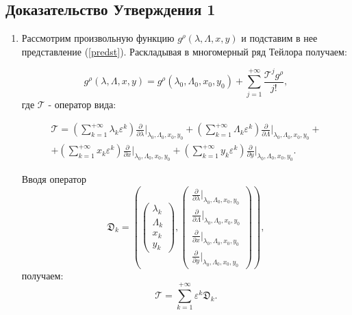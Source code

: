 \subsection{Доказательство Утверждения 1}

\begin{enumerate}

\item Рассмотрим произвольную функцию $g^\rho(\lambda,\Lambda,x,y)$ и подставим в нее представление (\ref{predst}). Раскладывая в многомерный ряд Тейлора получаем:

$$g^\rho(\lambda,\Lambda,x,y) = g^\rho(\lambda_0,\Lambda_0,x_0,y_0) + \sum_{j=1}^{+\infty} \frac{\mathcal{T}^j g^\rho}{j!},$$
где $\mathcal{T}$ - оператор вида:

\begin{multline*}
\mathcal{T} = 
\left(\sum_{k=1}^{+\infty} \lambda_k \varepsilon^k \right) \frac{\partial}{\partial \lambda} \bigg|_{\lambda_0,\Lambda_0,x_0,y_0}+
\left(\sum_{k=1}^{+\infty} \Lambda_k \varepsilon^k \right) \frac{\partial}{\partial \Lambda} \bigg|_{\lambda_0,\Lambda_0,x_0,y_0}+\\
+\left(\sum_{k=1}^{+\infty} x_k \varepsilon^k \right) \frac{\partial}{\partial x} \bigg|_{\lambda_0,\Lambda_0,x_0,y_0}
+\left(\sum_{k=1}^{+\infty} y_k \varepsilon^k \right) \frac{\partial}{\partial y} \bigg|_{\lambda_0,\Lambda_0,x_0,y_0}.
\end{multline*}

Вводя оператор
$$\mathfrak{D}_k = \left( \begin{pmatrix} \lambda_k\\ \Lambda_k \\ x_k \\ y_k \end{pmatrix},\begin{pmatrix} \frac{\partial}{\partial \lambda} |_{\lambda_0,\Lambda_0,x_0,y_0}\\ \frac{\partial}{\partial \Lambda} |_{\lambda_0,\Lambda_0,x_0,y_0} \\ \frac{\partial}{\partial x} |_{\lambda_0,\Lambda_0,x_0,y_0} \\ \frac{\partial}{\partial y} |_{\lambda_0,\Lambda_0,x_0,y_0} \end{pmatrix} \right),$$
получаем:
$$\mathcal{T} = \sum_{k=1}^{+\infty} \varepsilon^k \mathfrak{D}_k.$$


\end{enumerate}
